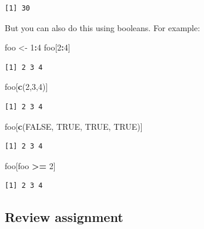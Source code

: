\documentclass[
]{book}
\newenvironment{Shaded}{\begin{snugshade}}{\end{snugshade}}
\newcommand{\DecValTok}[1]{\textcolor[rgb]{0.00,0.00,0.81}{#1}}
\newcommand{\KeywordTok}[1]{\textcolor[rgb]{0.13,0.29,0.53}{\textbf{#1}}}
\newcommand{\NormalTok}[1]{#1}
\newcommand{\OperatorTok}[1]{\textcolor[rgb]{0.81,0.36,0.00}{\textbf{#1}}}
\newcommand{\OtherTok}[1]{\textcolor[rgb]{0.56,0.35,0.01}{#1}}
\newcommand{\StringTok}[1]{\textcolor[rgb]{0.31,0.60,0.02}{#1}}
\begin{document}
\begin{verbatim}
[1] 30
\end{verbatim}

But you can also do this using booleans. For example:

\begin{Shaded}
\begin{Highlighting}[]
\NormalTok{foo <-}\StringTok{ }\DecValTok{1}\OperatorTok{:}\DecValTok{4}
\NormalTok{foo[}\DecValTok{2}\OperatorTok{:}\DecValTok{4}\NormalTok{]}
\end{Highlighting}
\end{Shaded}

\begin{verbatim}
[1] 2 3 4
\end{verbatim}

\begin{Shaded}
\begin{Highlighting}[]
\NormalTok{foo[}\KeywordTok{c}\NormalTok{(}\DecValTok{2}\NormalTok{,}\DecValTok{3}\NormalTok{,}\DecValTok{4}\NormalTok{)]}
\end{Highlighting}
\end{Shaded}

\begin{verbatim}
[1] 2 3 4
\end{verbatim}

\begin{Shaded}
\begin{Highlighting}[]
\NormalTok{foo[}\KeywordTok{c}\NormalTok{(}\OtherTok{FALSE}\NormalTok{, }\OtherTok{TRUE}\NormalTok{, }\OtherTok{TRUE}\NormalTok{, }\OtherTok{TRUE}\NormalTok{)]}
\end{Highlighting}
\end{Shaded}

\begin{verbatim}
[1] 2 3 4
\end{verbatim}

\begin{Shaded}
\begin{Highlighting}[]
\NormalTok{foo[foo }\OperatorTok{>=}\StringTok{ }\DecValTok{2}\NormalTok{]}
\end{Highlighting}
\end{Shaded}

\begin{verbatim}
[1] 2 3 4
\end{verbatim}

\hypertarget{review-assignment-5}{%
\subsection*{Review assignment}\label{review-assignment-5}}
\end{document}

